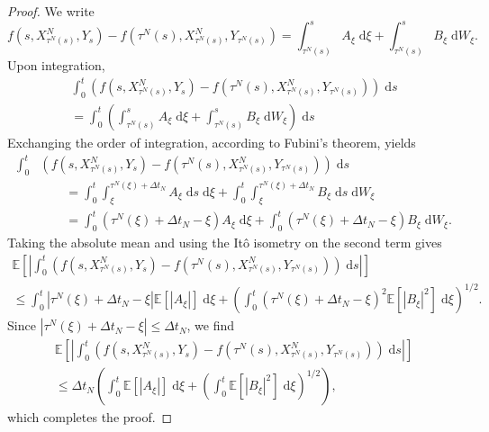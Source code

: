 \documentclass[reqno,12pt]{amsart}
\theoremstyle{plain}%
\theoremstyle{definition}
\begin{document}
\begin{proof}
    We write
    \[
        f(s, X_{\tau^N(s)}^N, Y_s) - f(\tau^N(s), X_{\tau^N(s)}^N, Y_{\tau^N(s)}) = \int_{\tau^N(s)}^s A_\xi \;\mathrm{d}\xi + \int_{\tau^N(s)}^s B_\xi \;\mathrm{d}W_\xi.
    \]
    Upon integration,
    \begin{multline*}
        \int_0^t \left(f(s, X_{\tau^N(s)}^N, Y_s) - f(\tau^N(s), X_{\tau^N(s)}^N, Y_{\tau^N(s)})\right)\;\mathrm{d}s  \\
        = \int_0^t \left(\int_{\tau^N(s)}^s A_\xi \;\mathrm{d}\xi + \int_{\tau^N(s)}^s B_\xi \;\mathrm{d}W_\xi\right)\;\mathrm{d}s
    \end{multline*}
    Exchanging the order of integration, according to Fubini's theorem, yields
    \begin{align*}
        \int_0^t & \left(f(s, X_{\tau^N(s)}^N, Y_s) - f(\tau^N(s), X_{\tau^N(s)}^N, Y_{\tau^N(s)})\right)\;\mathrm{d}s \\
        & \qquad = \int_0^t \int_\xi^{\tau^N(\xi)+\Delta t_N} A_\xi \;\mathrm{d}s\;\mathrm{d}\xi + \int_0^t \int_\xi^{\tau^N(\xi) + \Delta t_N} B_\xi \;\mathrm{d}s\;\mathrm{d}W_\xi \\
        & \qquad = \int_0^t (\tau^N(\xi)+\Delta t_N - \xi) A_\xi \;\mathrm{d}\xi + \int_0^t (\tau^N(\xi) + \Delta t_N - \xi) B_\xi \;\mathrm{d}W_\xi.
    \end{align*}
    Taking the absolute mean and using the It\^o isometry on the second term gives
    \begin{multline*}
        \mathbb{E}\left[\left|\int_0^t \left(f(s, X_{\tau^N(s)}^N, Y_s) - f(\tau^N(s), X_{\tau^N(s)}^N, Y_{\tau^N(s)})\right)\;\mathrm{d}s\right|\right]  \\
        \leq \int_0^t |\tau^N(\xi)+\Delta t_N - \xi| \mathbb{E}[|A_\xi|] \;\mathrm{d}\xi + \left(\int_0^t (\tau^N(\xi) + \Delta t_N - \xi)^2 \mathbb{E}[|B_\xi|^2] \;\mathrm{d}\xi \right)^{1/2}.
    \end{multline*}
    Since $|\tau^N(\xi)+\Delta t_N - \xi| \leq \Delta t_N$, we find
    \begin{multline*}
        \mathbb{E}\left[\left|\int_0^t \left(f(s, X_{\tau^N(s)}^N, Y_s) - f(\tau^N(s), X_{\tau^N(s)}^N, Y_{\tau^N(s)})\right)\;\mathrm{d}s\right|\right]  \\
        \leq \Delta t_N \left(\int_0^t \mathbb{E}[|A_\xi|] \;\mathrm{d}\xi + \left(\int_0^t \mathbb{E}[|B_\xi|^2] \;\mathrm{d}\xi \right)^{1/2}\right),
    \end{multline*}
    which completes the proof.
\end{proof}
\end{document}

